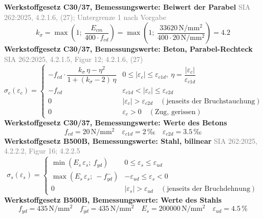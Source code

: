 \documentclass[11pt,a4paper]{article}
\newcommand{\normref}[1]{{\small\textcolor{gray}{#1}}}
\begin{document}
\noindent\textbf{Werkstoffgesetz C30/37, Bemessungswerte: Beiwert der Parabel} \hfill \normref{SIA 262:2025, 4.2.1.6, (27); Untergrenze 1 nach Vorgabe}
\begin{equation*}
k_{\sigma} = \max\left(1;\ \frac{E_{cm}}{400 \cdot f_{cd}}\right) = \max\left(1;\ \frac{33620\,\mathrm{N}/\mathrm{mm}^{2}}{400 \cdot 20\,\mathrm{N}/\mathrm{mm}^{2}}\right) = 4.2
\end{equation*}
\noindent\textbf{Werkstoffgesetz C30/37, Bemessungswerte: Beton, Parabel-Rechteck} \hfill \normref{SIA 262:2025, 4.2.1.5, Figur 12; 4.2.1.6, (27)}
\begin{equation*}
\sigma_c(\varepsilon_c) = \begin{cases} -f_{cd} \cdot \dfrac{k_\sigma\,\eta - \eta^2}{1 + (k_\sigma - 2)\,\eta} & 0 \le |\varepsilon_c| \le \varepsilon_{c1d},\ \eta = \dfrac{|\varepsilon_c|}{\varepsilon_{c1d}} \\[2ex] -f_{cd} & \varepsilon_{c1d} < |\varepsilon_c| \le \varepsilon_{c2d} \\[1ex] 0 & |\varepsilon_c| > \varepsilon_{c2d} \quad (\text{jenseits der Bruchstauchung}) \\[1ex] 0 & \varepsilon_c > 0 \quad (\text{Zug, gerissen}) \end{cases}
\end{equation*}
\noindent\textbf{Werkstoffgesetz C30/37, Bemessungswerte: Werte des Betons}
\begin{equation*}
f_{cd} = 20\,\mathrm{N}/\mathrm{mm}^{2} \quad \varepsilon_{c1d} = 2\,\text{‰} \quad \varepsilon_{c2d} = 3.5\,\text{‰}
\end{equation*}
\noindent\textbf{Werkstoffgesetz B500B, Bemessungswerte: Stahl, bilinear} \hfill \normref{SIA 262:2025, 4.2.2.2, Figur 16; 4.2.2.5}
\begin{equation*}
\sigma_s(\varepsilon_s) = \begin{cases} \min(E_s\,\varepsilon_s;\ f_{yd}) & 0 \le \varepsilon_s \le \varepsilon_{ud} \\[1ex] \max(E_s\,\varepsilon_s;\ -f_{yd}^{-}) & -\varepsilon_{ud} \le \varepsilon_s < 0 \\[1ex] 0 & |\varepsilon_s| > \varepsilon_{ud} \quad (\text{jenseits der Bruchdehnung}) \end{cases}
\end{equation*}
\noindent\textbf{Werkstoffgesetz B500B, Bemessungswerte: Werte des Stahls}
\begin{equation*}
f_{yd} = 435\,\mathrm{N}/\mathrm{mm}^{2} \quad f_{yd}^{-} = 435\,\mathrm{N}/\mathrm{mm}^{2} \quad E_s = 200000\,\mathrm{N}/\mathrm{mm}^{2} \quad \varepsilon_{ud} = 4.5\,\%
\end{equation*}
\end{document}
